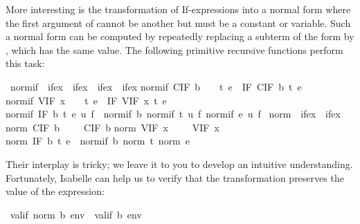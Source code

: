 \begin{isabellebody}
\begin{isamarkuptext}
More interesting is the transformation of If-expressions into a normal form
where the first argument of  cannot be another  but
must be a constant or variable. Such a normal form can be computed by
repeatedly replacing a subterm of the form  by
, which has the same value. The following
primitive recursive functions perform this task:%
\end{isamarkuptext}%
\ normif\ {\isacharcolon}{\isacharcolon}\ {\isachardoublequote}ifex\ {\isasymRightarrow}\ ifex\ {\isasymRightarrow}\ ifex\ {\isasymRightarrow}\ ifex{\isachardoublequote}\isanewline
{}\isanewline
{\isachardoublequote}normif\ {\isacharparenleft}CIF\ b{\isacharparenright}\ \ \ \ t\ e\ {\isacharequal}\ IF\ {\isacharparenleft}CIF\ b{\isacharparenright}\ t\ e{\isachardoublequote}\isanewline
{\isachardoublequote}normif\ {\isacharparenleft}VIF\ x{\isacharparenright}\ \ \ \ t\ e\ {\isacharequal}\ IF\ {\isacharparenleft}VIF\ x{\isacharparenright}\ t\ e{\isachardoublequote}\isanewline
{\isachardoublequote}normif\ {\isacharparenleft}IF\ b\ t\ e{\isacharparenright}\ u\ f\ {\isacharequal}\ normif\ b\ {\isacharparenleft}normif\ t\ u\ f{\isacharparenright}\ {\isacharparenleft}normif\ e\ u\ f{\isacharparenright}{\isachardoublequote}\isanewline
\isanewline
{}\ norm\ {\isacharcolon}{\isacharcolon}\ {\isachardoublequote}ifex\ {\isasymRightarrow}\ ifex{\isachardoublequote}\isanewline
{}\isanewline
{\isachardoublequote}norm\ {\isacharparenleft}CIF\ b{\isacharparenright}\ \ \ \ {\isacharequal}\ CIF\ b{\isachardoublequote}\isanewline
{\isachardoublequote}norm\ {\isacharparenleft}VIF\ x{\isacharparenright}\ \ \ \ {\isacharequal}\ VIF\ x{\isachardoublequote}\isanewline
{\isachardoublequote}norm\ {\isacharparenleft}IF\ b\ t\ e{\isacharparenright}\ {\isacharequal}\ normif\ b\ {\isacharparenleft}norm\ t{\isacharparenright}\ {\isacharparenleft}norm\ e{\isacharparenright}{\isachardoublequote}%
\begin{isamarkuptext}%
\noindent
Their interplay is tricky; we leave it to you to develop an
intuitive understanding. Fortunately, Isabelle can help us to verify that the
transformation preserves the value of the expression:%
\end{isamarkuptext}%
\ {\isachardoublequote}valif\ {\isacharparenleft}norm\ b{\isacharparenright}\ env\ {\isacharequal}\ valif\ b\ env{\isachardoublequote}%

\end{isabellebody}
